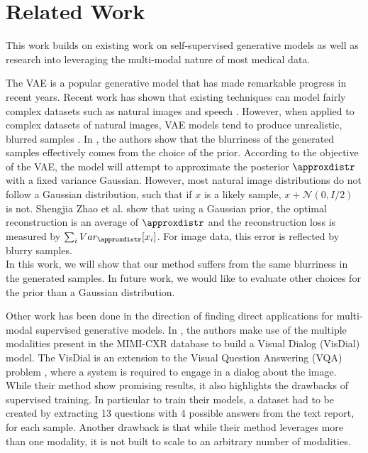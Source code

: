 \section{Related Work}


This work builds on existing work on self-supervised generative models as well as research into leveraging the multi-modal nature of most medical data.

The VAE is a popular generative model that has made remarkable progress in recent years.
Recent work has shown that existing techniques can model fairly complex datasets such as natural images and speech \cite{kingma2015variational, gulrajani2016pixelvae, bowman2015generating}.
However, when applied to complex datasets of natural images, VAE models tend to produce unrealistic, blurred samples \cite{zhao2017towards, dosovitskiy2016generating}.
In \cite{zhao2017towards}, the authors show that the blurriness of the generated samples effectively comes from the choice of the prior.
According to the objective of the VAE, the model will attempt to approximate the posterior $\approxdistr$ with a fixed variance Gaussian.
However, most natural image distributions do not follow a Gaussian distribution, such that if $x$ is a likely sample, $x + \mathcal{N}(0, I/2)$ is not.
Shengjia Zhao et al. \cite{zhao2017towards} show that using a Gaussian prior, the optimal reconstruction is an average of $\approxdistr$ and the reconstruction loss is measured by $\sum _i Var _{\approxdistr} [x_i]$.
For image data, this error is reflected by blurry samples.\\
In this work, we will show that our method suffers from the same blurriness in the generated samples.
In future work, we would like to evaluate other choices for the prior than a Gaussian distribution.

Other work has been done in the direction of finding direct applications for multi-modal supervised generative models.
In \cite{kovaleva2020towards}, the authors make use of the multiple modalities present in the MIMI-CXR database \cite{johnson2019mimic} to build a Visual Dialog (VisDial) \cite{das2017visual} model.
The VisDial is an extension to the Visual Question Answering (VQA) problem \cite{antol2015vqa}, where a system is required to engage in a dialog about the image.
While their method show promising results, it also highlights the drawbacks of supervised training.
In particular to train their models, a dataset had to be created by extracting 13 questions with 4 possible answers from the text report, for each sample.
Another drawback is that while their method leverages more than one modality, it is not built to scale to an arbitrary number of modalities.
